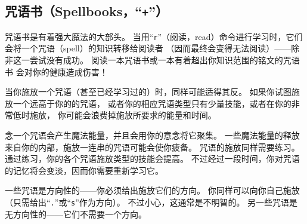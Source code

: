 \documentclass[a4paper, 10pt]{article}
\begin{document}
\subsection*{咒语书（Spellbooks，“{\tt +}”）}

咒语书是有着强大魔法的大部头。
当用“{\tt r}”（阅读，read）命令进行学习时，它们会将一个咒语（spell）的知识转移给阅读者
（因而最终会变得无法阅读）——除非这一尝试没有成功。
阅读一本\zhTransCursed{}咒语书或一本有着超出你知识范围的铭文的咒语书
会对你的健康造成伤害！

当你施放一个咒语（甚至已经学习过的）时，同样可能适得其反。
如果你试图施放一个远高于你的\zhTransExperienceLevel{}的咒语，
或者你的相应咒语类型只有少量技能，或者在你的\zhTransLuck{}非常低时施放，
你可能会浪费掉施放所要求的能量和时间。

念一个咒语会产生魔法能量，并且会用你的意念将它聚集。
一些魔法能量的释放来自你的内部，施放一连串的咒语可能会使你疲备。
咒语的施放同样需要练习。
通过练习，你的各个咒语施放类型的技能会提高。
不过经过一段时间，你对咒语的记忆将会变淡，因而你需要重新学习它。

一些咒语是方向性的——你必须给出施放它们的方向。
你同样可以向你自己施放（只需给出“{\tt .}”或“{\tt s}”作为方向）。
不过小心，这通常是不明智的。
另一些咒语是无方向性的——它们不需要一个方向。
\end{document}
